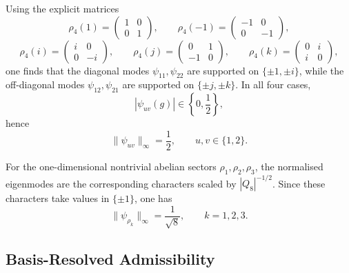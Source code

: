\documentclass[11pt,a4paper]{article}
\begin{document}
  Using the explicit matrices
  \begin{equation}
    \rho_4(1)=
    \begin{pmatrix}
      1 & 0 \\
      0 & 1
    \end{pmatrix},
    \qquad
    \rho_4(-1)=
    \begin{pmatrix}
      -1 & 0 \\
      0 & -1
    \end{pmatrix},
  \end{equation}
  \begin{equation}
    \rho_4(i)=
    \begin{pmatrix}
      i & 0 \\
      0 & -i
    \end{pmatrix},
    \qquad
    \rho_4(j)=
    \begin{pmatrix}
      0 & 1 \\
      -1 & 0
    \end{pmatrix},
    \qquad
    \rho_4(k)=
    \begin{pmatrix}
      0 & i \\
      i & 0
    \end{pmatrix},
  \end{equation}
  one finds that the diagonal modes $\psi_{11}, \psi_{22}$ are supported on
  $\{\pm 1, \pm i\}$, while the off-diagonal modes $\psi_{12}, \psi_{21}$ are
  supported on $\{\pm j, \pm k\}$.
  In all four cases,
  \begin{equation}
    |\psi_{uv}(g)| \in \left\{0,\frac{1}{2}\right\},
  \end{equation}
  hence
  \begin{equation}
    \|\psi_{uv}\|_\infty = \frac{1}{2},
    \qquad
    u,v \in \{1,2\}.
  \end{equation}

  For the one-dimensional nontrivial abelian sectors $\rho_1, \rho_2, \rho_3$,
  the normalised eigenmodes are the corresponding characters scaled by
  $|Q_8|^{-1/2}$.
  Since these characters take values in $\{\pm 1\}$, one has
  \begin{equation}
    \|\psi_{\rho_k}\|_\infty = \frac{1}{\sqrt{8}},
    \qquad
    k = 1,2,3.
  \end{equation}
\subsection{Basis-Resolved Admissibility}
  \label{subsec:basis-resolved-admissibility}
\end{document}
